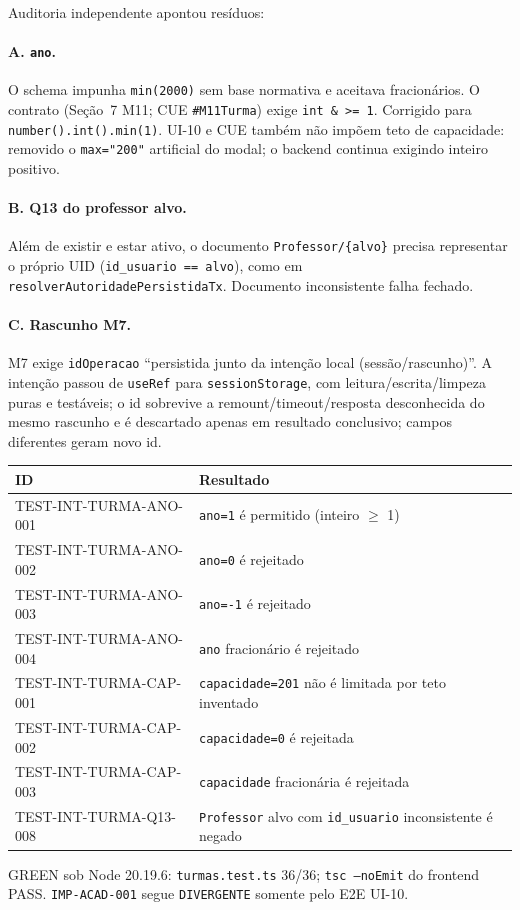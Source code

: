 Auditoria independente apontou resíduos:

\paragraph{A. \texttt{ano}.} O schema impunha \texttt{min(2000)} sem base
normativa e aceitava fracionários. O contrato (Seção~7 M11; CUE
\texttt{\#M11Turma}) exige \texttt{int \& >= 1}. Corrigido para
\texttt{number().int().min(1)}. UI-10 e CUE também não impõem teto de
capacidade: removido o \texttt{max="200"} artificial do modal; o backend
continua exigindo inteiro positivo.

\paragraph{B. Q13 do professor alvo.} Além de existir e estar ativo, o documento
\texttt{Professor/\{alvo\}} precisa representar o próprio UID
(\texttt{id\_usuario == alvo}), como em \texttt{resolverAutoridadePersistidaTx}.
Documento inconsistente falha fechado.

\paragraph{C. Rascunho M7.} M7 exige \texttt{idOperacao} ``persistida junto da
intenção local (sessão/rascunho)''. A intenção passou de \texttt{useRef} para
\texttt{sessionStorage}, com leitura/escrita/limpeza puras e testáveis; o id
sobrevive a remount/timeout/resposta desconhecida do mesmo rascunho e é
descartado apenas em resultado conclusivo; campos diferentes geram novo id.

\small
\begin{longtable}{@{}p{}p{}@{}}
\toprule
ID & Resultado \\
\midrule
\endhead
TEST-INT-TURMA-ANO-001 & \texttt{ano=1} é permitido (inteiro $\ge$ 1) \\
TEST-INT-TURMA-ANO-002 & \texttt{ano=0} é rejeitado \\
TEST-INT-TURMA-ANO-003 & \texttt{ano=-1} é rejeitado \\
TEST-INT-TURMA-ANO-004 & \texttt{ano} fracionário é rejeitado \\
TEST-INT-TURMA-CAP-001 & \texttt{capacidade=201} não é limitada por teto inventado \\
TEST-INT-TURMA-CAP-002 & \texttt{capacidade=0} é rejeitada \\
TEST-INT-TURMA-CAP-003 & \texttt{capacidade} fracionária é rejeitada \\
TEST-INT-TURMA-Q13-008 & \texttt{Professor} alvo com \texttt{id\_usuario} inconsistente é negado \\
\bottomrule
\end{longtable}
\normalsize

GREEN sob Node 20.19.6: \texttt{turmas.test.ts} 36/36; \texttt{tsc --noEmit} do
frontend PASS. \texttt{IMP-ACAD-001} segue \texttt{DIVERGENTE} somente pelo E2E
UI-10.
